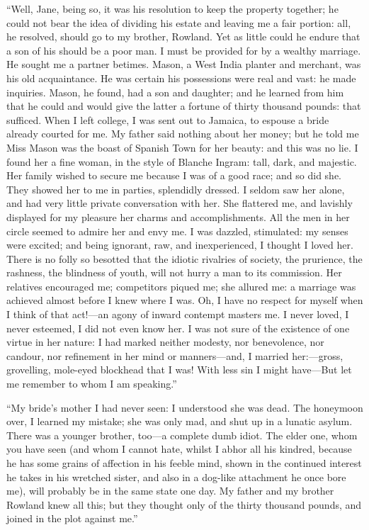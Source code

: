 \enquote{Well, Jane, being so, it was his resolution to keep the
	property together; he could not bear the idea of dividing his estate and
	leaving me a fair portion: all, he resolved, should go to my brother,
	Rowland. Yet as little could he endure that a son of his should be a
	poor man. I must be provided for by a wealthy marriage. He sought me a
	partner betimes. \Mr{} Mason, a West India planter and merchant, was his
	old acquaintance. He was certain his possessions were real and vast: he
	made inquiries. \Mr{} Mason, he found, had a son and daughter; and he
	learned from him that he could and would give the latter a fortune of
	thirty thousand pounds: that sufficed. When I left college, I was sent
	out to Jamaica, to espouse a bride already courted for me. My father
	said nothing about her money; but he told me Miss Mason was the boast of
	Spanish Town for her beauty: and this was no lie. I found her a fine
	woman, in the style of Blanche Ingram: tall, dark, and majestic. Her
	family wished to secure me because I was of a good race; and so did
	she. They showed her to me in parties, splendidly dressed. I seldom
	saw her alone, and had very little private conversation with her. She
	flattered me, and lavishly displayed for my pleasure her charms and
	accomplishments. All the men in her circle seemed to admire her and
	envy me. I was dazzled, stimulated: my senses were excited; and being
	ignorant, raw, and inexperienced, I thought I loved her. There is no
	folly so besotted that the idiotic rivalries of society, the prurience,
	the rashness, the blindness of youth, will not hurry a man to its
	commission. Her relatives encouraged me; competitors piqued me; she
	allured me: a marriage was achieved almost before I knew where I was.
	Oh, I have no respect for myself when I think of that act!---an agony of
	inward contempt masters me. I never loved, I never esteemed, I did not
	even know her. I was not sure of the existence of one virtue in her
	nature: I had marked neither modesty, nor benevolence, nor candour, nor
	refinement in her mind or manners---and, I married her:---gross,
	grovelling, mole-eyed blockhead that I was! With less sin I might
	have---But let me remember to whom I am speaking.}

\enquote{My bride's mother I had never seen: I understood she was dead.
	The honeymoon over, I learned my mistake; she was only mad, and shut up
	in a lunatic asylum. There was a younger brother, too---a complete dumb
	idiot. The elder one, whom you have seen (and whom I cannot hate,
	whilst I abhor all his kindred, because he has some grains of affection
	in his feeble mind, shown in the continued interest he takes in his
	wretched sister, and also in a dog-like attachment he once bore me),
	will probably be in the same state one day. My father and my brother
	Rowland knew all this; but they thought only of the thirty thousand
	pounds, and joined in the plot against me.}


